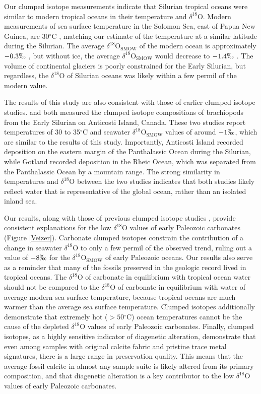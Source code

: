 \documentclass[5p, authoryear]{elsarticle}
\newcommand{\deltao}{$\delta^{18}$}
\newcommand{\degrees}{$^{\circ}$}
\begin{document}
Our clumped isotope measurements indicate that Silurian tropical oceans were similar to modern tropical oceans in their temperature and \deltao O. Modern measurements of sea surface temperature in the Solomon Sea, east of Papua New Guinea, are 30\degrees C \citep{Reynolds1994}, matching our estimate of the temperature at a similar latitude during the Silurian. The average \deltao O$_{\text{SMOW}}$ of the modern ocean is approximately $-0.3\permil$ \citep{Shackleton1974}, but without ice, the average \deltao O$_{\text{SMOW}}$ would decrease to $-1.4\permil$ \citep{Lhomme2005}. The volume of continental glaciers is poorly constrained for the Early Silurian, but regardless, the \deltao O of Silurian oceans was likely within a few permil of the modern value. 

The results of this study are also consistent with those of earlier clumped isotope studies. \cite{Came2007} and \cite{Finnegan2011} both measured the clumped isotope compositions of brachiopods from the Early Silurian on Anticosti Island, Canada. These two studies report temperatures of 30 to 35\degrees C and seawater \deltao O$_{\text{SMOW}}$ values of around $-1\permil$, which are similar to the results of this study. Importantly, Anticosti Island recorded deposition on the eastern margin of the Panthalassic Ocean during the Silurian, while Gotland recorded deposition in the Rheic Ocean, which was separated from the Panthalassic Ocean by a mountain range. The strong similarity in temperatures and \deltao O between the two studies indicates that both studies likely reflect water that is representative of the global ocean, rather than an isolated inland sea. 

Our results, along with those of previous clumped isotope studies \citep{Came2007,Dennis2013,Finnegan2011}, provide consistent explanations for the low \deltao O values of early Paleozoic carbonates (Figure \ref{Veizer}). Carbonate clumped isotopes constrain the contribution of a change in seawater \deltao O to only a few permil of the observed trend, ruling out a value of $-8\permil$ for the \deltao O$_{\text{SMOW}}$ of early Paleozoic oceans. Our results also serve as a reminder that many of the fossils preserved in the geologic record lived in tropical oceans. The \deltao O of carbonate in equilibrium with tropical ocean water should not be compared to the \deltao O of carbonate in equilibrium with water of average modern sea surface temperature, because tropical oceans are much warmer than the average sea surface temperature. Clumped isotopes additionally demonstrate that extremely hot ($>50$\degrees C) ocean temperatures cannot be the cause of the depleted \deltao O values of early Paleozoic carbonates. Finally, clumped isotopes, as a highly sensitive indicator of diagenetic alteration, demonstrate that even among samples with original calcite fabric and pristine trace metal signatures, there is a large range in preservation quality. This means that the average fossil calcite in almost any sample suite is likely altered from its primary composition, and that diagenetic alteration is a key contributor to the low \deltao O values of early Paleozoic carbonates. 
\end{document}
